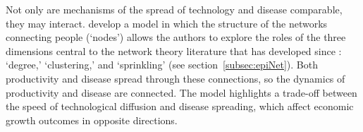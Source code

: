 
Not only are mechanisms of the spread of technology and disease comparable, they may interact.  \href{https://github.com/iworld1991/EpiExp/blob/master/Literature/fogli2012germs.pdf}{\cite{fogli2021germs}} develop a model in which the structure of the networks connecting people (`nodes') allows the authors to explore the roles of the three dimensions central to the network theory literature that has developed since \cite{erdos1960evolution}: `degree,' `clustering,' and `sprinkling' (see section~\ref{subsec:epiNet}).  Both productivity and disease spread through these connections, so the dynamics of productivity and disease are connected.  The model highlights a trade-off between the speed of technological diffusion and disease spreading, which affect economic growth outcomes in opposite directions.


